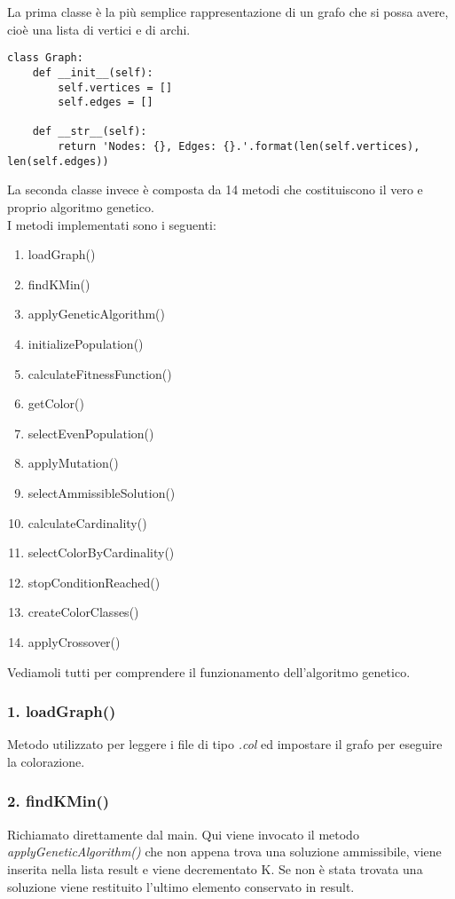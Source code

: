 \documentclass[12pt]{article}
\begin{document}
\begin{flushleft}
La prima classe è la più semplice rappresentazione di un grafo che si possa avere, cioè
una lista di vertici e di archi.
\begin{lstlisting}[belowskip=0.5 \baselineskip]
class Graph:
    def __init__(self):
        self.vertices = []
        self.edges = []

    def __str__(self):
        return 'Nodes: {}, Edges: {}.'.format(len(self.vertices), len(self.edges))
\end{lstlisting}

La seconda classe invece è composta da 14 metodi che costituiscono il vero e proprio algoritmo genetico.\\
I metodi implementati sono i seguenti:
\begin{enumerate}
\item loadGraph()
\item findKMin()
\item applyGeneticAlgorithm()
\item initializePopulation()
\item calculateFitnessFunction()
\item getColor()
\item selectEvenPopulation()
\item applyMutation()
\item selectAmmissibleSolution()
\item calculateCardinality()
\item selectColorByCardinality()
\item stopConditionReached()
\item createColorClasses()
\item applyCrossover()
\end{enumerate}

Vediamoli tutti per comprendere il funzionamento dell'algoritmo genetico.

\subsubsection*{1. loadGraph()}
Metodo utilizzato per leggere i file di tipo \textit{.col} ed impostare il grafo per eseguire la colorazione.

\subsubsection*{2. findKMin()}
Richiamato direttamente dal main. Qui viene invocato il metodo \textit{applyGeneticAlgorithm()}
che non appena trova una soluzione ammissibile, viene inserita nella lista result e viene decrementato K.
Se non è stata trovata una soluzione viene restituito l'ultimo elemento conservato in result.


\end{flushleft}
\end{document}
